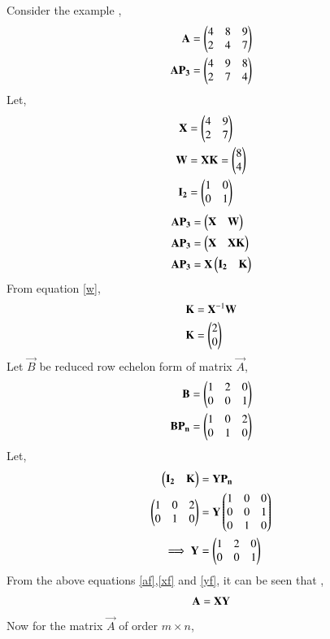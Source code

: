 \documentclass[journal,12pt,twocolumn]{IEEEtran}
\begin{document}
Consider the example , 
\begin{align}
    \vec{A}&=\myvec{4 & 8 & 9 \\ 2 & 4 & 7}\label{af}\\
    \vec{A}\vec{P_3}&=\myvec{4 & 9 & 8\\2 & 7 & 4}
\end{align}
Let,
\begin{align}
    \vec{X}&=\myvec{4 & 9 \\ 2 & 7}\label{xf}\\
    \vec{W}&=\vec{X}\vec{K}=\myvec{8 \\ 4}\label{w}\\ 
    \vec{I_2}&=\myvec{1 & 0 \\ 0 & 1}
\end{align}
\begin{align}
    \vec{A}\vec{P_3}&=\myvec{\vec{X} & \vec{W}}\\
    \vec{A}\vec{P_3}&=\myvec{\vec{X} & \vec{X}\vec{K}}\\
    \vec{A}\vec{P_3}&=\vec{X}\myvec{\vec{I_2} & \vec{K}}
\end{align}
From equation \eqref{w},
\begin{align}
    \vec{K}&=\vec{X}^{-1}\vec{W}\\
    \vec{K}&=\myvec{2 \\0}
\end{align}
Let $\vec{B}$ be reduced row echelon form of matrix $\vec{A}$,
\begin{align}
\vec{B}&=\myvec{1 & 2 & 0 \\0 & 0 & 1}\\
\vec{B}\vec{P_n}&=\myvec{1 & 0 & 2 \\ 0 & 1 & 0}
\end{align}
Let,
\begin{align}
    \myvec{\vec{I_2} & \vec{K}}&=\vec{Y}\vec{P_n}\\
    \myvec{1 & 0 & 2\\0 & 1 & 0}&=\vec{Y}\myvec{1 & 0 & 0\\0 & 0 &1\\0 & 1 & 0}\\
    \implies \vec{Y}&=\myvec{1 & 2 & 0 \\0 & 0 & 1}\label{yf}
\end{align}
From the above equations \eqref{af},\eqref{xf} and \eqref{yf}, it can be seen that ,
\begin{align}
    \vec{A}=\vec{X}\vec{Y}\notag
\end{align}
Now for the matrix $\vec{A}$ of order $m \times n$,
\end{document}
